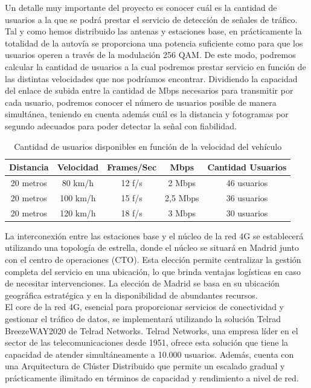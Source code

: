 Un detalle muy importante del proyecto es conocer cuál es la cantidad de usuarios a la que se podrá prestar el servicio de detección de señales de tráfico. Tal y como hemos distribuido las antenas y estaciones base, en prácticamente la totalidad de la autovía se proporciona una potencia suficiente como para que los usuarios operen a través de la modulación 256 QAM. De este modo, podremos calcular la cantidad de usuarios a la cual podremos prestar servicio en función de las distintas velocidades que nos podríamos encontrar.  Dividiendo la capacidad del enlace de subida entre la cantidad de Mbps necesarios para transmitir por cada usuario, podremos conocer el número de usuarios posible de manera simultánea, teniendo en cuenta además cuál es la distancia y fotogramas por segundo adecuados para poder detectar la señal con fiabilidad.

\begin{table}[H]
\centering
\begin{tabular}{|c|c|c|c|c|}
\hline
\textbf{Distancia} & \textbf{Velocidad} & \textbf{Frames/Sec} & \textbf{Mbps} & \textbf{Cantidad Usuarios} \\ \hline
20 metros          & 80 km/h            & 12 f/s              & 2 Mbps        & 46 usuarios                \\ \hline
20 metros          & 100 km/h           & 15 f/s              & 2,5 Mbps      & 36 usuarios                \\ \hline
20 metros          & 120 km/h           & 18 f/s              & 3 Mbps        & 30 usuarios                \\ \hline
\end{tabular}
\caption{Cantidad de usuarios disponibles en función de la velocidad del vehículo }
\label{users}
\end{table}

La interconexión entre las estaciones base y el núcleo de la red 4G se establecerá utilizando una topología de estrella, donde el núcleo se situará en Madrid junto con el centro de operaciones (CTO). Esta elección permite centralizar la gestión completa del servicio en una ubicación, lo que brinda ventajas logísticas en caso de necesitar intervenciones. La elección de Madrid se basa en su ubicación geográfica estratégica y en la disponibilidad de abundantes recursos.\\

El core de la red 4G, esencial para proporcionar servicios de conectividad y gestionar el tráfico de datos, se implementará utilizando la solución Telrad BreezeWAY2020 de Telrad Networks. Telrad Networks, una empresa líder en el sector de las telecomunicaciones desde 1951, ofrece esta solución que tiene la capacidad de atender simultáneamente a 10.000 usuarios. Además, cuenta con una Arquitectura de Clúster Distribuido que permite un escalado gradual y prácticamente ilimitado en términos de capacidad y rendimiento a nivel de red.\\

